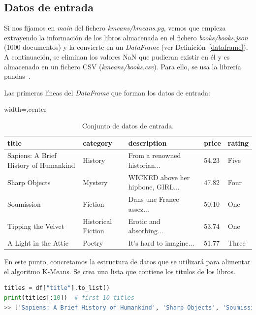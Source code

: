 \documentclass{uimppracticas}
\begin{document}
\subsection{Datos de entrada}

Si nos fijamos en \textit{main} del fichero \textit{kmeans/kmeans.py}, vemos que empieza extrayendo la información de los libros almacenada en el fichero \textit{books/books.json} (1000 documentos) y la convierte en un \textit{DataFrame} (ver Definición~\ref{dataframe}). A continuación, se eliminan los valores NaN que pudieran existir en él y es almacenado en un fichero CSV (\textit{kmeans/books.csv}). Para ello, se usa la librería pandas~\cite{jeff_reback_2020_4309786}.

Las primeras líneas del \textit{DataFrame} que forman los datos de entrada:

\begin{table}[h]
	\begin{adjustbox}{width=\columnwidth,center}
		\begin{tabular}{lllll}
			\toprule
			title & category & description & price & rating \\
			\midrule
			Sapiens: A Brief History of Humankind & History & From a renowned historian... & 54.23 & Five \\
			Sharp Objects & Mystery & WICKED above her hipbone, GIRL... & 47.82 & Four \\
			Soumission & Fiction & Dans une France assez... & 50.10 & One \\
			Tipping the Velvet & Historical Fiction & Erotic and absorbing... & 53.74 & One \\
			A Light in the Attic & Poetry & It's hard to imagine... & 51.77 & Three \\
			\bottomrule
		\end{tabular}
	\end{adjustbox}
	\caption{Conjunto de datos de entrada.}
	\label{table1}
\end{table}

En este punto, concretamos la estructura de datos que se utilizará para alimentar el algoritmo K-Means. Se crea una lista que contiene los títulos de los libros.

\begin{lstlisting}[language=python]
titles = df["title"].to_list()
print(titles[:10])  # first 10 titles
>> ['Sapiens: A Brief History of Humankind', 'Sharp Objects', 'Soumission', 'Tipping the Velvet', 'A Light in the Attic', "It's Only the Himalayas", 'Libertarianism for Beginners', 'Mesaerion: The Best Science Fiction Stories 1800-1849', 'Olio', 'Our Band Could Be Your Life: Scenes from the American Indie Underground, 1981-1991']
\end{lstlisting}
\end{document}

